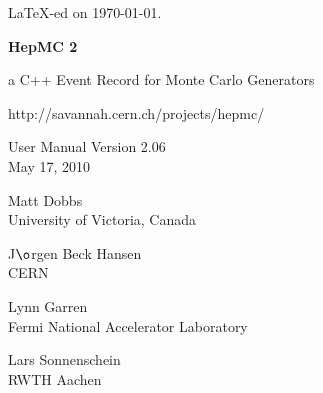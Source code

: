 \documentclass[11pt,letterpaper]{article}
\begin{document}
\newenvironment{fminipage}%
{\begin{Sbox}\begin{minipage}}%
{\end{minipage}\end{Sbox}\fbox{\TheSbox}}
%
%
%
\begin{titlepage}
{\tiny \LaTeX-ed on \today.}

\vspace{2cm}

\begin{center}

{\Huge\bf HepMC 2}

\vspace{1cm}

{\huge a C++ Event Record for Monte Carlo Generators }

\vspace{2cm}

{http://savannah.cern.ch/projects/hepmc/}

\vspace{1cm}

{\Large User Manual Version 2.06} \\
May 17, 2010

\vspace{2cm}

{\huge Matt Dobbs} \\
University of Victoria, Canada

\vspace{.2cm}

{\Large J$\o$rgen Beck Hansen} \\
CERN

\vspace{.2cm}

{\Large Lynn Garren} \\
Fermi National Accelerator Laboratory

\vspace{.2cm}

{\Large Lars Sonnenschein} \\
RWTH Aachen

\vspace{1cm}


\end{center}
\end{titlepage}
\end{document}

